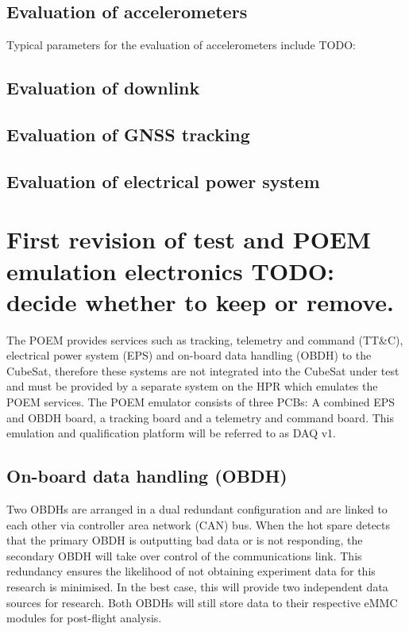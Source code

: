 \documentclass[a4paper,11pt]{article}
\begin{document}
\subsection{Evaluation of accelerometers}

Typical parameters for the evaluation of accelerometers include TODO:

\subsection{Evaluation of downlink}

\subsection{Evaluation of GNSS tracking}

\subsection{Evaluation of electrical power system}

\section{First revision of test and POEM emulation electronics TODO: decide whether to keep or remove.}

The POEM provides services such as tracking, telemetry and command (TT\&C), electrical power system (EPS) and on-board data handling (OBDH) to the CubeSat, therefore these systems are not integrated into the CubeSat under test and must be provided by a separate system on the HPR which emulates the POEM services. The POEM emulator consists of three PCBs: A combined EPS and OBDH board, a tracking board and a telemetry and command board. This emulation and qualification platform will be referred to as DAQ v1.

\subsection{On-board data handling (OBDH)}
Two OBDHs are arranged in a dual redundant configuration and are linked to each other via controller area network (CAN) bus. When the hot spare detects that the primary OBDH is outputting bad data or is not responding, the secondary OBDH will take over control of the communications link. This redundancy ensures the likelihood of not obtaining experiment data for this research is minimised. In the best case, this will provide two independent data sources for research. Both OBDHs will still store data to their respective eMMC modules for post-flight analysis.
\end{document}
